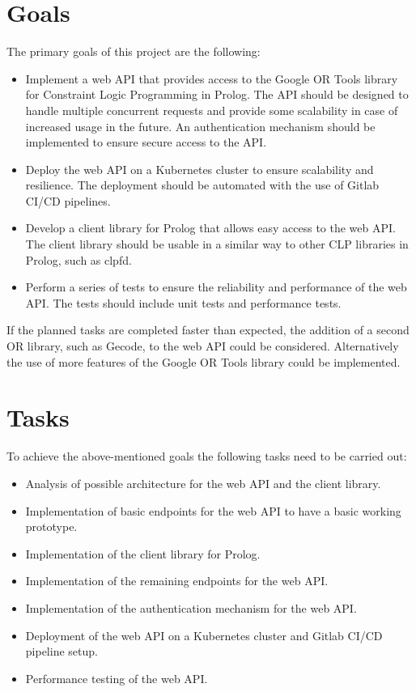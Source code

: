 \documentclass[en]{customTemplate}
\begin{document}
\clearpage

\section{Goals}

The primary goals of this project are the following:

\begin{itemize}
    \item Implement a web API that provides access to the Google OR Tools library for Constraint Logic Programming in Prolog. The API should be designed to handle multiple concurrent requests and provide some scalability in case of increased usage in the future. An authentication mechanism should be implemented to ensure secure access to the API.
    \item Deploy the web API on a Kubernetes cluster to ensure scalability and resilience. The deployment should be automated with the use of Gitlab CI/CD pipelines.
    \item Develop a client library for Prolog that allows easy access to the web API. The client library should be usable in a similar way to other CLP libraries in Prolog, such as clpfd.
    \item Perform a series of tests to ensure the reliability and performance of the web API. The tests should include unit tests and performance tests.
\end{itemize}

If the planned tasks are completed faster than expected, the addition of a second OR library, such as Gecode, to the web API could be considered. Alternatively the use of more features of the Google OR Tools library could be implemented.

\clearpage

\section{Tasks}

To achieve the above-mentioned goals the following tasks need to be carried out:

\begin{itemize}
    \item Analysis of possible architecture for the web API and the client library.
    \item Implementation of basic endpoints for the web API to have a basic working prototype.
    \item Implementation of the client library for Prolog.
    \item Implementation of the remaining endpoints for the web API.
    \item Implementation of the authentication mechanism for the web API.
    \item Deployment of the web API on a Kubernetes cluster and Gitlab CI/CD pipeline setup.
    \item Performance testing of the web API.
\end{itemize}
\end{document}
